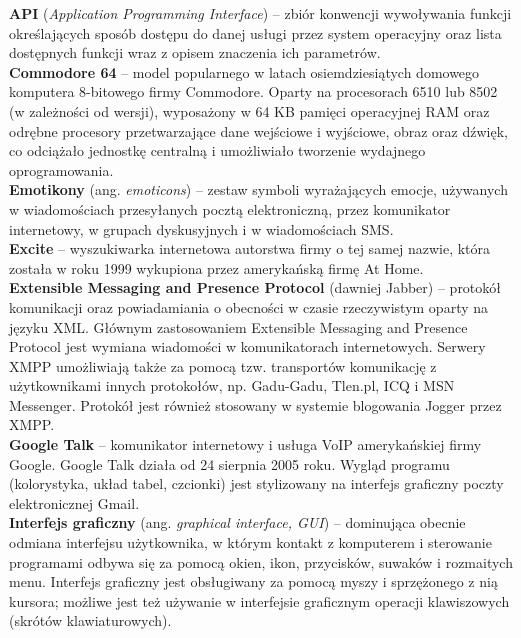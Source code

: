 \documentclass[a4paper,12pt]{article}
\begin{document}
\noindent\textbf{API} (\textit{Application Programming Interface}) -- zbiór konwencji wywoływania funkcji określających sposób dostępu do danej usługi przez system operacyjny oraz lista dostępnych funkcji wraz z opisem znaczenia ich parametrów.\\

\noindent\textbf{Commodore 64} -- model popularnego w latach osiemdziesiątych domowego komputera 8-bitowego firmy Commodore. Oparty na procesorach 6510 lub 8502 (w zależności od wersji), wyposażony w 64 KB pamięci operacyjnej RAM oraz odrębne procesory przetwarzające dane wejściowe i wyjściowe, obraz oraz dźwięk, co odciążało jednostkę centralną i umożliwiało tworzenie wydajnego oprogramowania.\\

\noindent\textbf{Emotikony} (ang. \textit{emoticons}) -- zestaw symboli wyrażających emocje, używanych w wiadomościach przesyłanych pocztą elektroniczną, przez komunikator internetowy, w grupach dyskusyjnych i w wiadomościach SMS.\\

\noindent\textbf{Excite} -- wyszukiwarka internetowa autorstwa firmy o tej samej nazwie, która została w roku 1999 wykupiona przez amerykańską firmę At Home.\\

\noindent\textbf{Extensible Messaging and Presence Protocol} (dawniej Jabber) -- protokół komunikacji oraz powiadamiania o obecności w czasie rzeczywistym oparty na języku XML. Głównym zastosowaniem Extensible Messaging and Presence Protocol jest wymiana wiadomości w komunikatorach internetowych. Serwery XMPP umożliwiają także za pomocą tzw. transportów komunikację z użytkownikami innych protokołów, np. Gadu-Gadu, Tlen.pl, ICQ i MSN Messenger.
Protokół jest również stosowany w systemie blogowania Jogger przez XMPP.\\

\noindent\textbf{Google Talk} -- komunikator internetowy i usługa VoIP amerykańskiej firmy Google. Google Talk działa od 24 sierpnia 2005 roku. Wygląd programu (kolorystyka, układ tabel, czcionki) jest stylizowany na interfejs graficzny poczty elektronicznej Gmail.\\

\noindent\textbf{Interfejs graficzny} (ang. \textit{graphical interface, GUI}) -- dominująca obecnie odmiana interfejsu użytkownika, w którym kontakt z komputerem i sterowanie programami odbywa się za pomocą okien, ikon, przycisków, suwaków i rozmaitych menu. Interfejs graficzny jest obsługiwany za pomocą myszy i sprzężonego z nią kursora; możliwe jest też używanie w interfejsie graficznym operacji klawiszowych (skrótów klawiaturowych).\\
\end{document}
